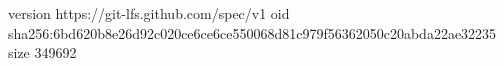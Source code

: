 version https://git-lfs.github.com/spec/v1
oid sha256:6bd620b8e26d92c020ce6ce6ce550068d81c979f56362050c20abda22ae32235
size 349692
